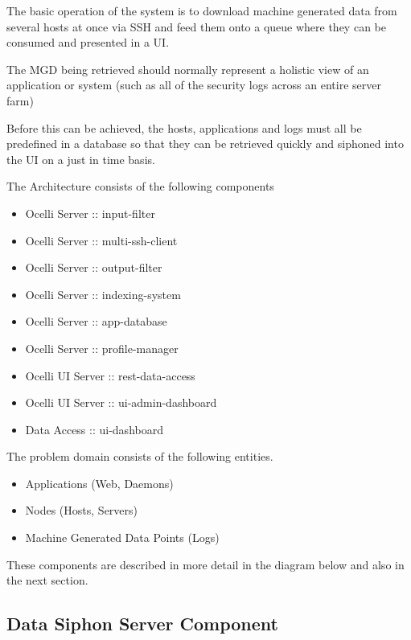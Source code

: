 \documentclass{llncs}
\begin{document}
The basic operation of the system is to download machine generated data from several hosts at once via SSH and feed them onto a queue where they can be consumed and presented in a UI.

The MGD being retrieved should normally represent a holistic view of an application or system (such as all of the security logs across an entire server farm)

Before this can be achieved, the hosts, applications and logs must all be predefined in a database so that they can be retrieved quickly and siphoned into the UI on a just in time basis.

The Architecture consists of the following components

\begin{itemize}
\item	Ocelli Server :: input-filter
\item	Ocelli Server :: multi-ssh-client
\item	Ocelli Server :: output-filter
\item	Ocelli Server :: indexing-system
\item	Ocelli Server :: app-database
\item	Ocelli Server :: profile-manager
\end{itemize}

\begin{itemize}
\item	Ocelli UI Server :: rest-data-access
\item	Ocelli UI Server :: ui-admin-dashboard
\end{itemize}

\begin{itemize}
\item	Data Access :: ui-dashboard
\end{itemize}

The problem domain consists of the following entities.

\begin{itemize}
\item	Applications (Web, Daemons)
\item	Nodes (Hosts, Servers)
\item	Machine Generated Data Points (Logs)
\end{itemize}

These components are described in more detail in the diagram below and also in the next section.
  
\subsection{Data Siphon Server Component}
\end{document}
